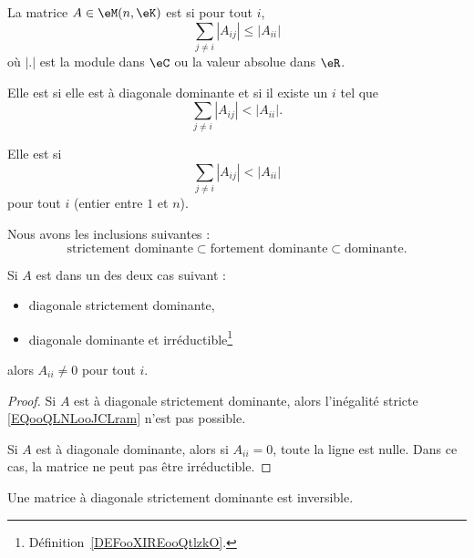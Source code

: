 \begin{definition}        \label{DEFooLSUTooHuXabV}
	La matrice \( A\in \eM(n,\eK)\) est  si pour tout \( i\),
	\begin{equation}
		\sum_{j\neq i}| A_{ij} |\leq | A_{ii} |
	\end{equation}
	où \( | . |\) est la module dans \( \eC\) ou la valeur absolue dans \( \eR\).

	Elle est  si elle est à diagonale dominante et si il existe un \( i\) tel que
	\begin{equation}
		\sum_{j\neq i}| A_{ij} |< | A_{ii} |.
	\end{equation}

	Elle est  si
	\begin{equation}        \label{EQooQLNLooJCLram}
		\sum_{j\neq i}| A_{ij} |< | A_{ii} |
	\end{equation}
	pour tout \( i\) (entier entre \( 1\) et \( n\)).
\end{definition}

Nous avons les inclusions suivantes :
\begin{equation}
	\text{strictement dominante}\subset\text{fortement dominante}\subset\text{dominante}.
\end{equation}

\begin{lemma}       \label{LEMooMQAEooUCkQxU}
	Si \( A\) est dans un des deux cas suivant :
	\begin{itemize}
		\item diagonale strictement dominante,
		\item diagonale dominante et irréductible\footnote{Définition~\ref{DEFooXIREooQtlzkO}.}
	\end{itemize}
	alors \( A_{ii}\neq 0\) pour tout \( i\).
\end{lemma}

\begin{proof}
	Si \( A\) est à diagonale strictement dominante, alors l'inégalité stricte \eqref{EQooQLNLooJCLram} n'est pas possible.

	Si \( A\) est à diagonale dominante, alors si \( A_{ii}=0\), toute la ligne est nulle. Dans ce cas, la matrice ne peut pas être irréductible.
\end{proof}

\begin{proposition}
	Une matrice à diagonale strictement dominante est inversible.
\end{proposition}


